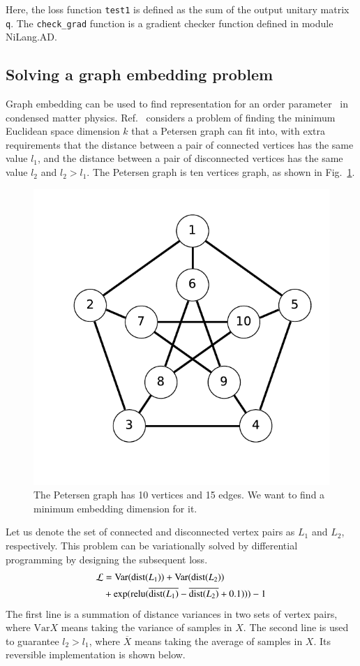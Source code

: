 \documentclass{article}
\newcommand{\<}{\langle}
\renewcommand{\>}{\rangle}
\newcommand{\Var}{{\mathrm{Var}}}
\newcommand{\Fig}[1]{Fig.~\ref{#1}}
\newcommand{\Ref}[1]{Ref.~\cite{#1}}
\theoremstyle{definition}\newtheorem{definition}{\textit{Definition}}
\begin{document}
Here, the loss function \texttt{test1} is defined as the sum of the output unitary matrix \texttt{q}. The \texttt{check\_grad} function is a gradient checker function defined in module NiLang.AD.

\subsection{Solving a graph embedding problem}\label{sec:graph}
Graph embedding can be used to find representation for an order parameter~\cite{Takahashi2020} in condensed matter physics.
\Ref{Takahashi2020} considers a problem of finding the minimum Euclidean space dimension $k$ that a Petersen graph can fit into, with extra requirements that the distance between a pair of connected vertices has the same value $l_1$, and the distance between a pair of disconnected vertices has the same value $l_2$ and $l_2 > l_1$.
The Petersen graph is ten vertices graph, as shown in \Fig{fig:petersen}.\begin{figure}
    \centerline{\includegraphics[width=0.4\columnwidth,trim={0 1cm 0 0},clip]{petersen.pdf}}
    \caption{The Petersen graph has 10 vertices and 15 edges. We want to find a minimum embedding dimension for it.}\label{fig:petersen}
\end{figure}
Let us denote the set of connected and disconnected vertex pairs as $L_1$ and $L_2$, respectively. This problem can be variationally solved by differential programming by designing the subsequent loss.
\begin{align}
    \begin{split}
        \mathcal{L} &= \Var({\rm dist}(L_1)) + \Var({\rm dist}(L_2)) \\
        &+\exp({\rm relu}(\overline{{\rm dist}(L_1)} - \overline{{\rm dist}(L_2)} + 0.1))) - 1
    \end{split}
\end{align}
The first line is a summation of distance variances in two sets of vertex pairs, where $\Var{X}$ means taking the variance of samples in $X$.
The second line is used to guarantee $l_2 > l_1$, where $\overline{X}$ means taking the average of samples in $X$.
Its reversible implementation is shown below.
\end{document}
